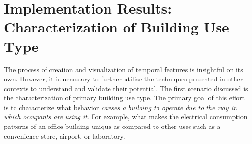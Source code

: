 \section{Implementation Results: Characterization of Building Use Type}
\label{sec:results_usetype}

The process of creation and visualization of temporal features is insightful on its own. However, it is necessary to further utilize the techniques presented in other contexts to understand and validate their potential. The first scenario discussed is the characterization of primary building use type. The primary goal of this effort is to characterize what behavior \emph{causes a building to operate due to the way in which occupants are using it}. For example, what makes the electrical consumption patterns of an office building unique as compared to other uses such as a convenience store, airport, or laboratory.